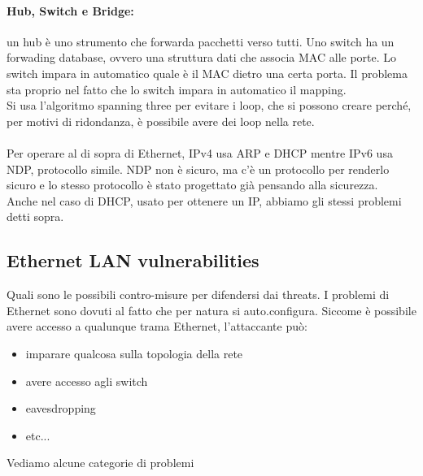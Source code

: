 \documentclass[12pt, oneside]{extbook} %
\begin{document}
\paragraph{Hub, Switch e Bridge:} un hub è uno strumento che forwarda pacchetti verso tutti. Uno switch ha un forwading database, ovvero una struttura dati che associa MAC alle porte. Lo switch impara in automatico quale è il MAC dietro una certa porta. Il problema sta proprio nel fatto che lo switch impara in automatico il mapping.\\ Si usa l'algoritmo spanning three per evitare i loop, che si possono creare perché, per motivi di ridondanza, è possibile avere dei loop nella rete.\\\\ Per operare al di sopra di Ethernet, IPv4 usa ARP e DHCP mentre IPv6 usa NDP, protocollo simile. NDP non è sicuro, ma c'è un protocollo per renderlo sicuro e lo stesso protocollo è stato progettato già pensando alla sicurezza.\\ Anche nel caso di DHCP, usato per ottenere un IP, abbiamo gli stessi problemi detti sopra.
\subsection{Ethernet LAN vulnerabilities}
Quali sono le possibili contro-misure per difendersi dai threats. I problemi di Ethernet sono dovuti al fatto che per natura si auto.configura. Siccome è possibile avere accesso a qualunque trama Ethernet, l'attaccante può:
\begin{itemize}
\item imparare qualcosa sulla topologia della rete
\item avere accesso agli switch
\item eavesdropping
\item etc...
\end{itemize}
Vediamo alcune categorie di problemi
\end{document}
